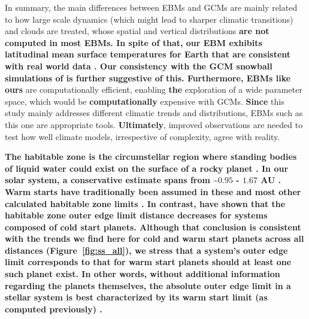 \documentclass[fleqn,usenatbib]{mnras}
\providecommand{\DIFadd}[1]{{\bf #1}} %
\providecommand{\DIFdel}[1]{} %
\providecommand{\DIFaddbegin}{} %
\providecommand{\DIFaddend}{} %
\providecommand{\DIFdelbegin}{} %
\providecommand{\DIFdelend}{} %
\newcommand{\DIFscaledelfig}{0.5}
\newlength{\DIFdelgraphicswidth} %
\newlength{\DIFdelgraphicsheight} %
\newcommand{\DIFaddincludegraphics}[2][]{{\color{blue}\fbox{\DIFOincludegraphics[#1]{#2}}}} %
\newcommand{\DIFdelincludegraphics}[2][]{%
\sbox{\DIFdelgraphicsbox}{\DIFOincludegraphics[#1]{#2}}%
\settoboxwidth{\DIFdelgraphicswidth}{\DIFdelgraphicsbox} %
\settoboxtotalheight{\DIFdelgraphicsheight}{\DIFdelgraphicsbox} %
\scalebox{\DIFscaledelfig}{%
\parbox[b]{\DIFdelgraphicswidth}{\usebox{\DIFdelgraphicsbox}\\[-\baselineskip] \rule{\DIFdelgraphicswidth}{0em}}\llap{\resizebox{\DIFdelgraphicswidth}{\DIFdelgraphicsheight}{%
\setlength{\unitlength}{\DIFdelgraphicswidth}%
\begin{picture}(1,1)%
\thicklines\linethickness{2pt} %
{\color[rgb]{1,0,0}\put(0,0){\framebox(1,1){}}}%
{\color[rgb]{1,0,0}\put(0,0){\line( 1,1){1}}}%
{\color[rgb]{1,0,0}\put(0,1){\line(1,-1){1}}}%
\end{picture}%
}\hspace*{3pt}}} %
} %
\DeclareRobustCommand{\DIFaddbegin}{\DIFOaddbegin \let\includegraphics\DIFaddincludegraphics} %
\DeclareRobustCommand{\DIFaddend}{\DIFOaddend \let\includegraphics\DIFOincludegraphics} %
\DeclareRobustCommand{\DIFdelbegin}{\DIFOdelbegin \let\includegraphics\DIFdelincludegraphics} %
\DeclareRobustCommand{\DIFdelend}{\DIFOaddend \let\includegraphics\DIFOincludegraphics} %
\begin{document}
In summary, the main differences between EBMs and GCMs are mainly related to how large scale dynamics (which might lead to sharper climatic transitions) and clouds are treated, whose spatial and vertical distributions \DIFdelbegin \DIFdel{cannot be accurately predicted by EBMs. Nevertheless, EBMs }\DIFdelend \DIFaddbegin \DIFadd{are not computed in most EBMs. In spite of that, our EBM exhibits latitudinal mean surface temperatures for Earth that are consistent with real world data \citep{RamirezLevi2018}. Our consistency with the GCM snowball simulations of \citet{hoffman_snowball_2017} is further suggestive of this. Furthermore, EBMs like ours }\DIFaddend are computationally efficient, enabling \DIFaddbegin \DIFadd{the }\DIFaddend exploration of a wide parameter space, which would be \DIFdelbegin \DIFdel{computational }\DIFdelend \DIFaddbegin \DIFadd{computationally }\DIFaddend expensive with GCMs. \DIFdelbegin \DIFdel{Furthermore, since }\DIFdelend \DIFaddbegin \DIFadd{Since }\DIFaddend this study mainly addresses different climatic trends and distributions, EBMs such as this one are appropriate tools. \DIFdelbegin \DIFdel{Nevertheless}\DIFdelend \DIFaddbegin \DIFadd{Ultimately}\DIFaddend , improved observations are needed to test how well climate models, irrespective of complexity, agree with reality.

\DIFaddbegin \DIFadd{The habitable zone is the circumstellar region where standing bodies of liquid water could exist on the surface of a rocky planet \citep{Ramirez2018}. In our solar system, a conservative estimate spans from \textasciitilde $0.95$ - $1.67$ AU \citep{kasting1993, Ramirez2018}. Warm starts have traditionally been assumed in these
and most other calculated habitable zone limits \citep{kasting1993, pierregaidos2011, KumarKopparapu2013,zsom2013, ramirez2017, ramirez2020complex, ramirez2020}. 
In contrast, \citet{kadoya_outer_2019} have shown that the habitable zone outer edge limit distance decreases for systems composed of cold start planets.  Although that conclusion is consistent with the trends we find here for cold and warm start planets across all distances (Figure~\ref{fig:ss_all}), we stress that a system's outer edge limit corresponds to that for warm start planets should at least one such planet exist. In other words, without additional information regarding the planets themselves, the absolute outer edge limit in a stellar system is best characterized by its warm start limit (as computed previously) \citep{kasting1993, KumarKopparapu2013}.
}
\end{document}
